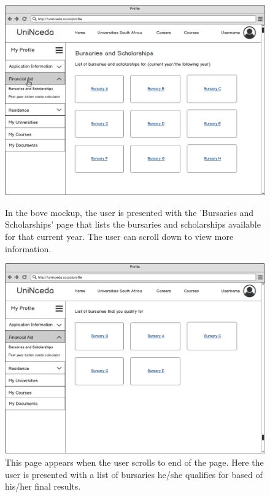 \documentclass[a4paper, 12pt]{article}
\begin{document}
\begin{figure}[H]
\centering
\includegraphics[scale=0.35]{ProfileFinancialAidBursaries}
\caption{In the bove mockup, the user is presented with the 'Bursaries and Scholarships' page that lists the bursaries and scholarships available for that current year. The user can scroll down to view more information.}
\label{ProfileFinancialAidBursaries}

\vspace{1cm}

\includegraphics[scale=0.35]{ProfileFinancialAidBursariesPage2}
\caption{This page appears when the user scrolls to end of the page. Here the user is presented with a list of bursaries he/she qualifies for based of his/her final results.}
\label{ProfileFinancialAidBursariesPage2}

\end{figure}
\end{document}
